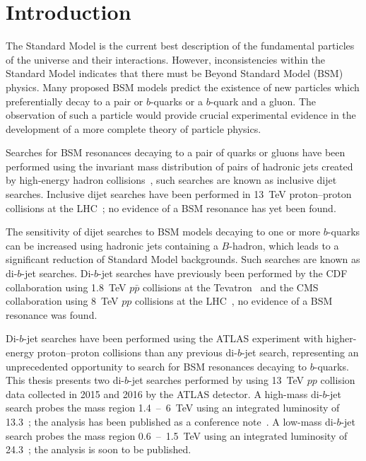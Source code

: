\chapter{Introduction}
\label{sec:int}
\vspace{-1.5em}
The Standard Model is the current best description of the fundamental particles of the universe and their interactions.
However, inconsistencies within the Standard Model indicates that
there must be Beyond Standard Model (BSM) physics.
Many proposed BSM models predict the existence of new particles
which preferentially decay to a pair or $b$-quarks or a $b$-quark and a gluon.
The observation of such a particle would provide crucial experimental
evidence in the development of a more complete theory of particle physics.


Searches for BSM resonances decaying to a pair of quarks or gluons
have been performed using the invariant mass distribution of pairs of hadronic jets created
by high-energy hadron collisions~\cite{theo-dijet_harris}, such searches are known as inclusive dijet searches.
Inclusive dijet searches have been performed in 13~TeV proton--proton collisions at the LHC~\cite{dijet-mori16_paper,dijet-mori17_paper,dijet-cms};
no evidence of a BSM resonance has yet been found.

The sensitivity of dijet searches to BSM models decaying to one or more $b$-quarks can be increased
using hadronic jets containing a $B$-hadron,
which leads to a significant reduction of Standard Model backgrounds.
Such searches are known as di-$b$-jet searches.
Di-$b$-jet searches have previously been performed by
the CDF collaboration using 1.8~TeV $p\bar{p}$ collisions at the Tevatron~\cite{dibjet-cdf}
and the CMS collaboration using 8~TeV $pp$ collisions at the LHC~\cite{dibjet-cms},
no evidence of a BSM resonance was found.

Di-$b$-jet searches have been performed using the ATLAS experiment
with higher-energy proton--proton collisions than any previous \mbox{di-$b$-jet} search,
representing an unprecedented opportunity to search for BSM resonances decaying to $b$-quarks.
This thesis presents two di-$b$-jet searches performed by using
13~TeV $pp$ collision data collected in 2015 and 2016 by the ATLAS detector.
A high-mass di-$b$-jet search probes the mass region 1.4~--~6~TeV using an integrated luminosity of 13.3~\ifb{};
the analysis has been published as a conference note~\cite{dibjet-ichep_conf}.
A low-mass di-$b$-jet search probes the mass region 0.6~--~1.5~TeV using an integrated luminosity of 24.3~\ifb{};
the analysis is soon to be published.

